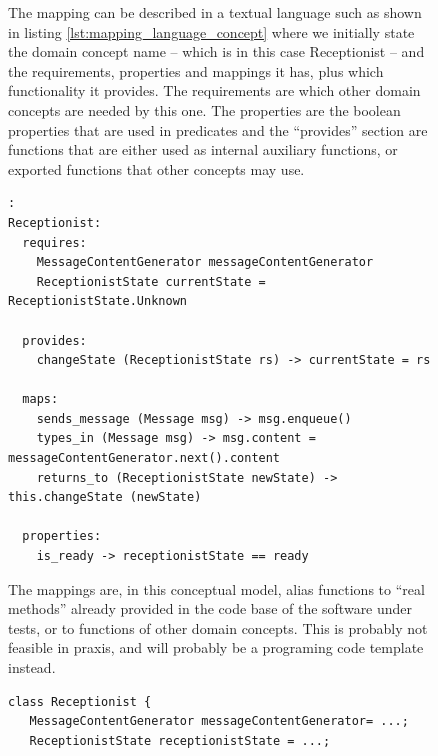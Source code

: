 \begin{figure}[!htbp]
The mapping can be described in a textual language such as shown in listing \ref{lst:mapping_language_concept} where we initially state the domain concept name -- which is in this case Receptionist -- and the requirements, properties and mappings it has, plus which functionality it provides. The requirements are which other domain concepts are needed by this one. The properties are the boolean properties that are used in predicates and the ``provides'' section are functions that are either used as internal auxiliary functions, or exported functions that other concepts may use.

\begin{lstlisting}[caption=example language for mapping concepts,label={lst:mapping_language_concept}]:
Receptionist:
  requires:
    MessageContentGenerator messageContentGenerator
    ReceptionistState currentState = ReceptionistState.Unknown
  
  provides:
    changeState (ReceptionistState rs) -> currentState = rs
  
  maps:
    sends_message (Message msg) -> msg.enqueue()
    types_in (Message msg) -> msg.content = messageContentGenerator.next().content
    returns_to (ReceptionistState newState) -> this.changeState (newState)

  properties:
    is_ready -> receptionistState == ready
\end{lstlisting}
The mappings are, in this conceptual model, alias functions to ``real methods'' already provided in the code base of the software under tests, or to functions of other domain concepts. This is probably not feasible in praxis, and will probably be a programing code template instead.

\begin{lstlisting}[caption=Pseudo code representing Receptionist domain actor,label={lst:code_for_receptionist_domain_actor}]
class Receptionist {
   MessageContentGenerator messageContentGenerator= ...;
   ReceptionistState receptionistState = ...;
  

\end{lstlisting}
\end{figure}
